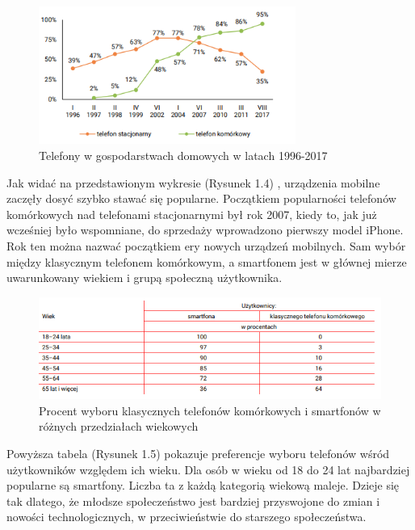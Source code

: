 \documentclass[a4paper,12pt,oneside]{book}
\begin{document}
	\newpage
	\begin{figure}[h]
		\centering
		\includegraphics[width=0.75\textwidth]{grafika/cbos_wykres.png}
		\caption{Telefony w gospodarstwach domowych w latach 1996-2017}
	\end{figure}

	Jak widać na przedstawionym wykresie (Rysunek 1.4) \cite{ref4}, urządzenia mobilne zaczęły dosyć szybko stawać się popularne. Początkiem popularności telefonów komórkowych nad telefonami stacjonarnymi był rok 2007, kiedy to, jak już wcześniej było wspomniane, do sprzedaży wprowadzono pierwszy model iPhone. Rok ten można nazwać początkiem ery nowych urządzeń mobilnych. Sam wybór między klasycznym telefonem komórkowym, a smartfonem jest w głównej mierze uwarunkowany wiekiem i grupą społeczną użytkownika.
	
	\begin{figure}[h]
		\centering
		\includegraphics[width=1\textwidth]{grafika/cbos_wykres2.png}
		\caption{Procent wyboru klasycznych telefonów komórkowych i smartfonów w różnych przedziałach wiekowych}
	\end{figure}

	\newpage

	Powyższa tabela (Rysunek 1.5) \cite{ref4} pokazuje preferencje wyboru telefonów wśród użytkowników względem ich wieku. Dla osób w wieku od 18 do 24 lat najbardziej popularne są smartfony. Liczba ta z każdą kategorią wiekową maleje. Dzieje się tak dlatego, że młodsze społeczeństwo jest bardziej przyswojone do zmian i nowości technologicznych, w przeciwieństwie do starszego społeczeństwa.
	
\end{document}
